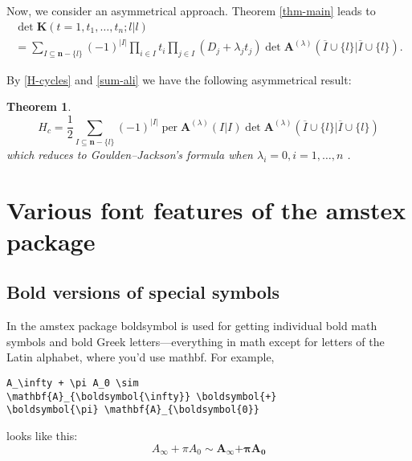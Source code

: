 \documentclass[draft]{amsart}
\newcommand{\ntt}{\normalfont\ttfamily}
\newcommand{\cn}[1]{{\protect\ntt\bslash#1}}
\newcommand{\pkg}[1]{{\protect\ntt#1}}
\newtheorem{thm}{Theorem}[section]
\theoremstyle{definition}
\theoremstyle{remark}
\newcommand{\per}{\operatorname{per}}
\begin{document}
Now, we consider an asymmetrical approach. Theorem \ref{thm-main} leads to
\begin{multline}
\det\mathbf{K}(t=1,t_1,\dots,t_n;l |l )\\
=\sum_{I\subseteq\mathbf{n}-\{l \}}
(-1)^{|I|}\prod_{i\in I}t_i\prod_{j\in I}
(D_j+\lambda_jt_j)\det\mathbf{A}^{(\lambda)}
(\overline I\cup\{l \}|\overline I\cup\{l \}).
\end{multline}

By \eqref{H-cycles} and \eqref{sum-ali} we have the following asymmetrical
result:
\begin{thm}\label{thm-asym}
\begin{equation}
H_c=\frac12\sum_{I\subseteq\mathbf{n}-\{l \}}
(-1)^{|I|}\per\mathbf{A}^{(\lambda)}(I|I)\det
\mathbf{A}^{(\lambda)}
(\overline I\cup\{l \}|\overline I\cup\{l \})
\end{equation}
which reduces to Goulden--Jackson's formula when $\lambda_i=0,i=1,\dots,n$
\cite{mami:matrixth}.
\end{thm}

\section{Various font features of the {\ntt amstex} package}
\label{s:font}
\subsection{Bold versions of special symbols}

In the \pkg{amstex} package \cn{boldsymbol} is used for getting
individual bold math symbols and bold Greek letters---everything in
math except for letters of the Latin alphabet,
where you'd use \cn{mathbf}.  For example,
\begin{verbatim}
A_\infty + \pi A_0 \sim
\mathbf{A}_{\boldsymbol{\infty}} \boldsymbol{+}
\boldsymbol{\pi} \mathbf{A}_{\boldsymbol{0}}
\end{verbatim}
looks like this:
\[A_\infty + \pi A_0 \sim \mathbf{A}_{\boldsymbol{\infty}}
\boldsymbol{+} \boldsymbol{\pi} \mathbf{A}_{\boldsymbol{0}}\]
\end{document}
